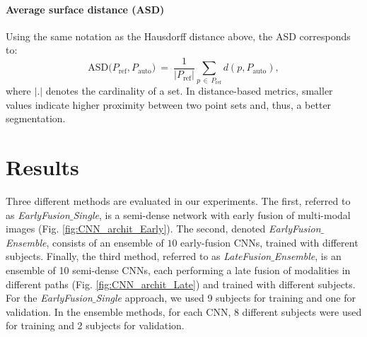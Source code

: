\documentclass[twoside,espcrc2]{elsarticle}
\newcommand{\mr}[1]{\mathrm{#1}}
\begin{document}
\paragraph{Average surface distance (ASD)}

Using the same notation as the Hausdorff distance above, the ASD corresponds to:
\begin{equation}
    \mr{ASD}\big(P_\mr{ref}, P_\mr{auto} \big) \ = \ 
     \frac{1}{|P_\mr{ref}|} \sum_{p \, \in \, P_\mr{ref}} 
     d(p, P_\mr{auto}),
\end{equation}
where $|.|$ denotes the cardinality of a set. 
In distance-based metrics, smaller values indicate higher proximity between two point sets and, thus, a better segmentation.

\section{Results}\label{sec:results}

Three different methods are evaluated in our experiments. The first, referred to as \textit{EarlyFusion$\_$Single}, is a semi-dense network with early fusion of multi-modal images (Fig. \ref{fig:CNN_archit_Early}). The second, denoted \textit{EarlyFusion$\_$Ensemble}, consists of an ensemble of $10$ early-fusion CNNs, trained with different subjects. Finally, the third method, referred to as \textit{LateFusion$\_$Ensemble}, is an ensemble of 10 semi-dense CNNs, each performing a late fusion of modalities in different paths (Fig. \ref{fig:CNN_archit_Late}) and trained with different subjects. 
For the \textit{EarlyFusion$\_$Single} approach, we used 9 subjects for training and one for validation. In the ensemble methods, for each CNN, 8 different subjects were used for training and 2 subjects for validation.
\end{document}
